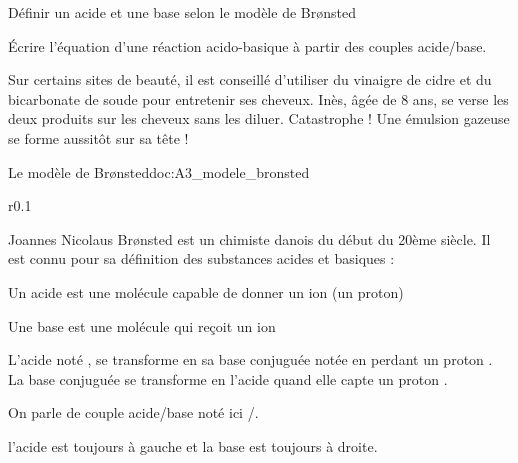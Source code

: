\tetePremStssChim


\begin{objectifs}
  \item Définir un acide et une base selon le modèle de Br\o{}nsted
  \item Écrire l’équation d’une réaction acido-basique à partir des couples acide/base.
\end{objectifs}

\begin{contexte}
  Sur certains sites de beauté, il est conseillé d’utiliser du vinaigre de cidre et du bicarbonate de soude pour entretenir ses cheveux.
  Inès, âgée de 8 ans, se verse les deux produits sur les cheveux sans les diluer.
  Catastrophe ! Une émulsion gazeuse se forme aussitôt sur sa tête !

\end{contexte}

\begin{doc}{Le modèle de Br\o{}nsted}{doc:A3_modele_bronsted}
  \begin{wrapfigure}[3]{r}{0.1\linewidth}
  \end{wrapfigure}

  Joannes Nicolaus Br\o{}nsted est un chimiste danois du début du 20ème siècle.
  Il est connu pour sa définition des substances acides et basiques : 
  \begin{encart}    
    \begin{listePoints}
      \item Un acide est une molécule capable de donner un ion  (un proton)
      \item Une base est une molécule qui reçoit un ion 
    \end{listePoints}
  \end{encart}
  
  L'acide noté , se transforme en sa base conjuguée notée  en perdant un proton .
  La base conjuguée  se transforme en l'acide  quand elle capte un proton .

  \begin{encart}
    On parle de couple acide/base noté ici /.    
  \end{encart}
  \attention l'acide est toujours à gauche et la base est toujours à droite.

  \exemple
\end{doc}

